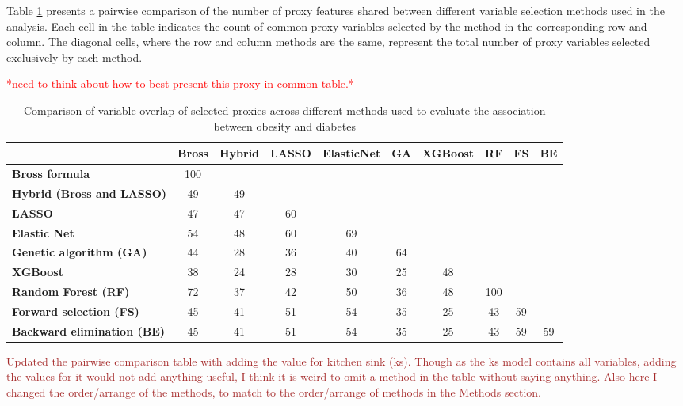 \documentclass[sn-vancouver,Numbered,lineno,pdflatex]{sn-jnl}
\begin{document}
Table \ref{tab:method-comparison} presents a pairwise comparison of the
number of proxy features shared between different variable selection
methods used in the analysis. Each cell in the table indicates the count
of common proxy variables selected by the method in the corresponding
row and column. The diagonal cells, where the row and column methods are
the same, represent the total number of proxy variables selected
exclusively by each method.

\textcolor{red}{*need to think about how to best present this proxy in common table.*}

\begin{table}[htbp]
\centering
\caption{Comparison of variable overlap of selected proxies across different methods used to evaluate the association between obesity and diabetes}
\label{tab:method-comparison}
\begin{tabular}{lccccccccc}
\toprule
 & \textbf{Bross} & \textbf{Hybrid} & \textbf{LASSO} & \textbf{ElasticNet} & \textbf{GA} & \textbf{XGBoost} & \textbf{RF} & \textbf{FS} & \textbf{BE} \\
\midrule
\textbf{Bross formula} & 100 & & & & & & & & \\
\textbf{Hybrid (Bross and LASSO)} & 49 & 49 & & & & & & & \\
\textbf{LASSO} & 47 & 47 & 60 & & & & & & \\
\textbf{Elastic Net} & 54 & 48 & 60 & 69 & & & & & \\
\textbf{Genetic algorithm (GA)} & 44 & 28 & 36 & 40 & 64 & & & & \\
\textbf{XGBoost} & 38 & 24 & 28 & 30 & 25 & 48 & & & \\
\textbf{Random Forest (RF)} & 72 & 37 & 42 & 50 & 36 & 48 & 100 & & \\
\textbf{Forward selection (FS)} & 45 & 41 & 51 & 54 & 35 & 25 & 43 & 59 & \\
\textbf{Backward elimination (BE)} & 45 & 41 & 51 & 54 & 35 & 25 & 43 & 59 & 59 \\
\bottomrule
\end{tabular}
\end{table}

\textcolor{brown}{Updated the pairwise comparison table with adding the value for kitchen sink (ks). Though as the ks model contains all variables, adding the values for it would not add anything useful, I think it is weird to omit a method in the table without saying anything. Also here I changed the order/arrange of the methods, to match to the order/arrange of methods in the Methods section.}
\end{document}
